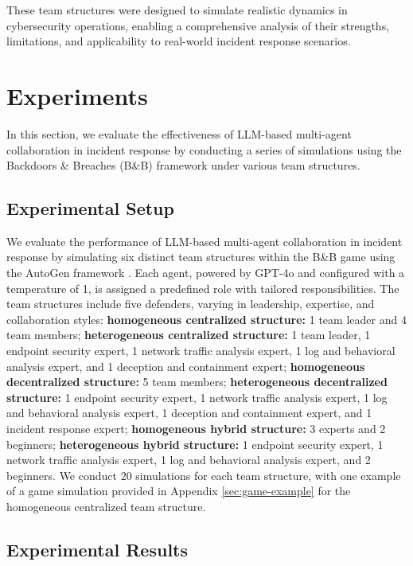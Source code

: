 \documentclass[letterpaper]{article} %
\begin{document}
These team structures were designed to simulate realistic dynamics in cybersecurity operations, enabling a comprehensive analysis of their strengths, limitations, and applicability to real-world incident response scenarios.

\section{Experiments}

In this section, we evaluate the effectiveness of LLM-based multi-agent collaboration in incident response by conducting a series of simulations using the Backdoors \& Breaches (B\&B) framework under various team structures.

\subsection{Experimental Setup}

We evaluate the performance of LLM-based multi-agent collaboration in incident response by simulating six distinct team structures within the B\&B game using the AutoGen framework \citep{wu2023autogen}. Each agent, powered by GPT-4o \citep{achiam2023gpt} and configured with a temperature of 1, is assigned a predefined role with tailored responsibilities. The team structures include five defenders, varying in leadership, expertise, and collaboration styles: \textbf{homogeneous centralized structure:} 1 team leader and 4 team members; \textbf{heterogeneous centralized structure:} 1 team leader, 1 endpoint security expert, 1 network traffic analysis expert, 1 log and behavioral analysis expert, and 1 deception and containment expert; \textbf{homogeneous decentralized structure:} 5 team members; \textbf{heterogeneous decentralized structure:} 1 endpoint security expert, 1 network traffic analysis expert, 1 log and behavioral analysis expert, 1 deception and containment expert, and 1 incident response expert; \textbf{homogeneous hybrid structure:} 3 experts and 2 beginners; \textbf{heterogeneous hybrid structure:} 1 endpoint security expert, 1 network traffic analysis expert, 1 log and behavioral analysis expert, and 2 beginners. We conduct 20 simulations for each team structure, with one example of a game simulation provided in Appendix \ref{sec:game-example} for the homogeneous centralized team structure.

\subsection{Experimental Results}
\end{document}
